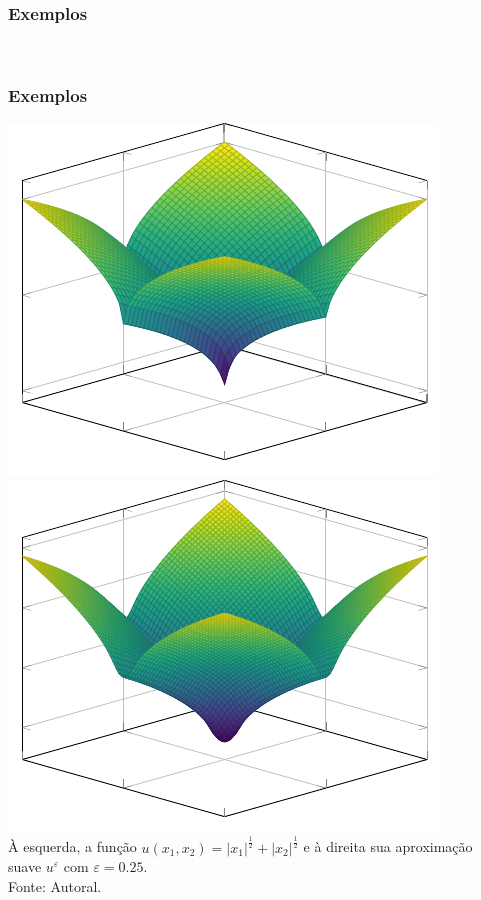 \documentclass[xcolor=dvipsnames, aspectratio=169, 10pt]{beamer}
\begin{document}
\begin{frame}
    \frametitle{Exemplos}
    \begin{center}
        \\
    \end{center}
\end{frame}
\begin{frame}
    \frametitle{Exemplos}
    \begin{center}
        \includegraphics[width=0.4\columnwidth]{../u.pdf}
        \hspace{10mm}
        \includegraphics[width=0.4\columnwidth]{../uε2.pdf}\\
        À esquerda, a função $u(x_1,x_2) = |x_1|^{\frac{1}{2}} + |x_2|^{\frac{1}{2}}$ e à direita sua aproximação\\suave $u^\varepsilon$ com $\varepsilon = 0.25$.\\Fonte: Autoral.
    \end{center}
\end{frame}
\end{document}
